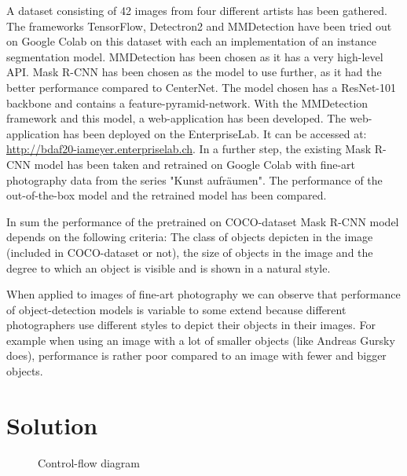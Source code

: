 \documentclass[a4paper,10pt,hidelinks]{scrartcl}
\begin{document}
A dataset consisting of 42 images from four different artists has been gathered. The frameworks TensorFlow, Detectron2 and MMDetection have been tried out on Google Colab on this dataset with each an implementation of an instance segmentation model. MMDetection has been chosen as it has a very high-level API. Mask R-CNN has been chosen as the model to use further, as it had the better performance compared to CenterNet. The model chosen has a ResNet-101 backbone and contains a feature-pyramid-network. With the MMDetection framework and this model, a web-application has been developed. The web-application has been deployed on the EnterpriseLab. It can be accessed at: \url{http://bdaf20-iameyer.enterpriselab.ch}. In a further step, the existing Mask R-CNN model has been taken and retrained on Google Colab with fine-art photography data from the series "Kunst aufräumen". The performance of the out-of-the-box model and the retrained model has been compared.

In sum the performance of the pretrained on COCO-dataset Mask R-CNN model depends on the following criteria: The class of objects depicten in the image (included in COCO-dataset or not), the size of objects in the image and the degree to which an object is visible and is shown in a natural style.

When applied to images of fine-art photography we can observe that performance of object-detection models is variable to some extend because different photographers use different styles to depict their objects in their images. For example when using an image with a lot of smaller objects (like Andreas Gursky does), performance is rather poor compared to an image with fewer and bigger objects. %

\section{\fontsize{14}{16}\selectfont Solution}

\begin{figure}
	\caption{\label{fig:control-flow} Control-flow diagram}
\end{figure}
\end{document}
